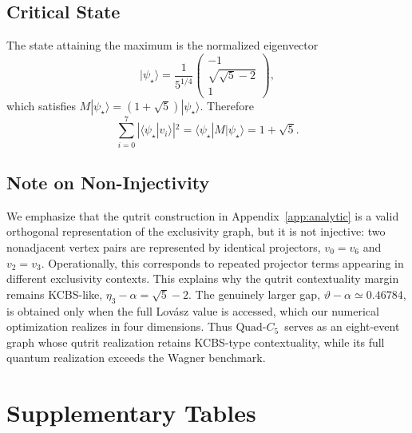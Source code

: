 \documentclass[aps,pra,twocolumn,superscriptaddress,longbibliography,floatfix]{revtex4-2}
\newcommand{\vt}{\vartheta}
\newcommand{\al}{\alpha}
\newcommand{\QC}{\ensuremath{\text{Quad-}C_5}}
\begin{document}
\subsection{Critical State}

The state attaining the maximum is the normalized eigenvector
\begin{equation}
  |\psi_\star\rangle = \frac{1}{5^{1/4}}
  \begin{pmatrix} -1\\ \sqrt{\sqrt{5}-2}\\ 1 \end{pmatrix},
  \label{eq:psi_star}
\end{equation}
which satisfies $M|\psi_\star\rangle=(1+\sqrt{5})|\psi_\star\rangle$.
Therefore
\begin{equation}
  \sum_{i=0}^{7}|\langle\psi_\star|v_i\rangle|^2
  = \langle\psi_\star|M|\psi_\star\rangle = 1+\sqrt{5}.
\end{equation}

\subsection{Note on Non-Injectivity}

We emphasize that the qutrit construction in Appendix~\ref{app:analytic}
is a valid orthogonal representation of the exclusivity graph, but it is
not injective: two
nonadjacent vertex pairs are represented by identical projectors,
$v_0=v_6$ and $v_2=v_3$.
Operationally, this corresponds to repeated projector terms appearing in
different exclusivity contexts.
This explains why the qutrit contextuality margin remains KCBS-like,
$\eta_3-\al=\sqrt{5}-2$.
The genuinely larger gap, $\vt-\al\simeq0.46784$, is obtained only when
the full Lov\'{a}sz value is accessed, which our numerical optimization
realizes in four dimensions.
Thus \QC\ serves as an eight-event graph whose qutrit realization
retains KCBS-type contextuality, while its full quantum realization
exceeds the Wagner benchmark.

\clearpage
\section{Supplementary Tables}
\label{app:tables}
\end{document}
